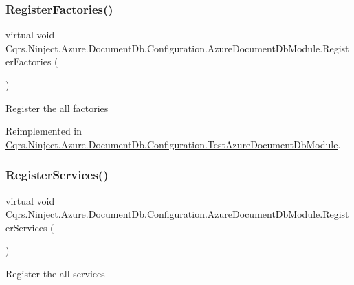 \subsubsection{\texorpdfstring{Register\+Factories()}{RegisterFactories()}}
{\footnotesize\ttfamily virtual void Cqrs.\+Ninject.\+Azure.\+Document\+Db.\+Configuration.\+Azure\+Document\+Db\+Module.\+Register\+Factories (\begin{DoxyParamCaption}{ }\end{DoxyParamCaption})\hspace{0.3cm}{\ttfamily [virtual]}}



Register the all factories 



Reimplemented in \hyperlink{classCqrs_1_1Ninject_1_1Azure_1_1DocumentDb_1_1Configuration_1_1TestAzureDocumentDbModule_a9bd41611cfee1edc8a88815c366fccae_a9bd41611cfee1edc8a88815c366fccae}{Cqrs.\+Ninject.\+Azure.\+Document\+Db.\+Configuration.\+Test\+Azure\+Document\+Db\+Module}.

\mbox{\label{classCqrs_1_1Ninject_1_1Azure_1_1DocumentDb_1_1Configuration_1_1AzureDocumentDbModule_ae47d987c2f32d3167ebda105f5fc8743_ae47d987c2f32d3167ebda105f5fc8743}} 
\subsubsection{\texorpdfstring{Register\+Services()}{RegisterServices()}}
{\footnotesize\ttfamily virtual void Cqrs.\+Ninject.\+Azure.\+Document\+Db.\+Configuration.\+Azure\+Document\+Db\+Module.\+Register\+Services (\begin{DoxyParamCaption}{ }\end{DoxyParamCaption})\hspace{0.3cm}{\ttfamily [virtual]}}



Register the all services 


